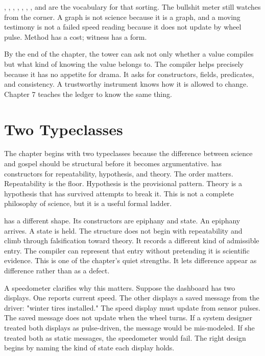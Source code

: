 , , , ,
, , , and  are
the vocabulary for that sorting. The bullshit meter still watches from the
corner. A graph is not science because it is a graph, and a moving testimony is
not a failed speed reading because it does not update by wheel pulse. Method
has a cost; witness has a form.

By the end of the chapter, the tower can ask not only whether a value compiles
but what kind of knowing the value belongs to. The compiler helps precisely
because it has no appetite for drama. It asks for constructors, fields,
predicates, and consistency. A trustworthy instrument knows how it is allowed
to change. Chapter 7 teaches the ledger to know the same thing.

\section{Two Typeclasses}
\label{se:two-typeclasses}

The chapter begins with two typeclasses because the difference between science
and gospel should be structural before it becomes argumentative. 
has constructors for repeatability, hypothesis, and theory. The order matters.
Repeatability is the floor. Hypothesis is the provisional pattern. Theory is a
hypothesis that has survived attempts to break it. This is not a complete
philosophy of science, but it is a useful formal ladder.

 has a different shape. Its constructors are epiphany and state.
An epiphany arrives. A state is held. The structure does not begin with
repeatability and climb through falsification toward theory. It records a
different kind of admissible entry. The compiler can represent that entry
without pretending it is scientific evidence. This is one of the chapter's
quiet strengths. It lets difference appear as difference rather than as a
defect.

A speedometer clarifies why this matters. Suppose the dashboard has two
displays. One reports current speed. The other displays a saved message from
the driver: "winter tires installed." The speed display must update from
sensor pulses. The saved message does not update when the wheel turns. If a
system designer treated both displays as pulse-driven, the message would be
mis-modeled. If she treated both as static messages, the speedometer would
fail. The right design begins by naming the kind of state each display holds.

